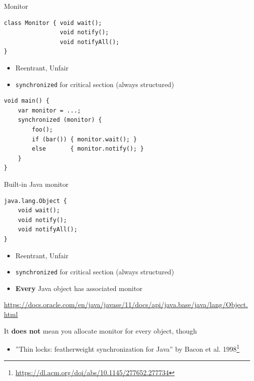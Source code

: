 \showTOCSub

\begin{frame}[t,fragile]{Monitor}

\begin{verbatim}
class Monitor { void wait();
                void notify();
                void notifyAll();
}
\end{verbatim}

\begin{itemize}
    \item Reentrant, Unfair
    \item \texttt{synchronized} for critical section (always structured)
\end{itemize}

\begin{verbatim}
void main() {
    var monitor = ...;
    synchronized (monitor) {
        foo();
        if (bar()) { monitor.wait(); } 
        else       { monitor.notify(); }    
    }
}
\end{verbatim}
\end{frame}


\begin{frame}[t,fragile]{Built-in Java monitor}

\begin{verbatim}
java.lang.Object {
    void wait();
    void notify();
    void notifyAll();
}
\end{verbatim}

\begin{itemize}
    \item Reentrant, Unfair
    \item \texttt{synchronized} for critical section (always structured)
    \item \textbf{Every} Java object has associated monitor
\end{itemize}

{\small\url{https://docs.oracle.com/en/java/javase/11/docs/api/java.base/java/lang/Object.html}}

\pause
It \textbf{does not} mean you allocate monitor for every object, though
\begin{itemize}
    \item ''Thin locks: featherweight synchronization for Java'' by Bacon et al. 1998\footnote<2->{\tiny\url{https://dl.acm.org/doi/abs/10.1145/277652.277734}}
\end{itemize}
\end{frame}


